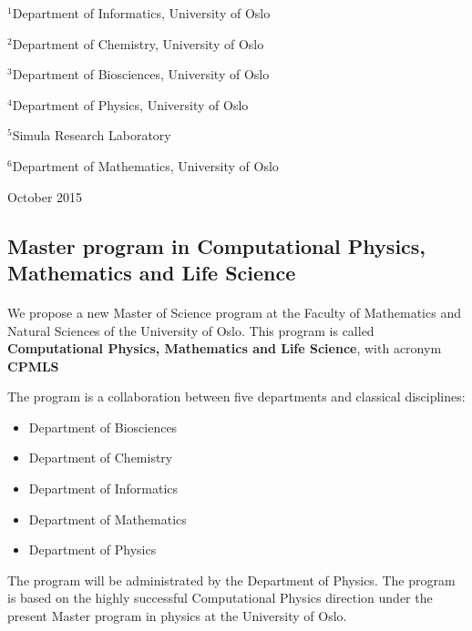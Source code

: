 \documentclass[%
oneside,                 %
final,                   %
10pt]{article}
\begin{document}
\begin{center}
\centerline{{\small ${}^1$Department of Informatics, University of Oslo}}
\centerline{{\small ${}^2$Department of Chemistry, University of Oslo}}
\centerline{{\small ${}^3$Department of Biosciences, University of Oslo}}
\centerline{{\small ${}^4$Department of Physics, University of Oslo}}
\centerline{{\small ${}^5$Simula Research Laboratory}}
\centerline{{\small ${}^6$Department of Mathematics, University of Oslo}}
\end{center}
    

\begin{center}
October 2015
\end{center}

\vspace{1cm}


\subsection*{Master program in Computational Physics, Mathematics and Life Science}

\paragraph{}
We propose a new Master of Science program at the Faculty of Mathematics and Natural Sciences of the University of Oslo. This program is called  \textbf{Computational Physics, Mathematics and Life Science}, with acronym  \textbf{CPMLS} 


The program is a collaboration between five departments and classical disciplines:

\begin{itemize}
 \item Department of Biosciences

 \item Department of Chemistry

 \item Department of Informatics

 \item Department of Mathematics

 \item Department of Physics
\end{itemize}

\noindent
The program will be administrated by the Department of Physics. 
The program is based on the highly successful Computational Physics direction under the present Master program
in physics at the University of Oslo.   
\end{document}
